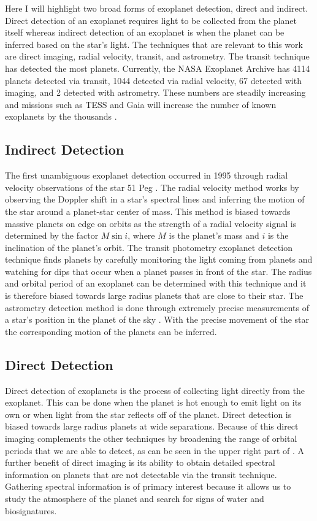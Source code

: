 Here I will highlight two broad forms of exoplanet detection, direct and
indirect. Direct detection of an exoplanet requires light to be collected from
the planet itself whereas indirect detection of an exoplanet is when the planet
can be inferred based on the star's light. The techniques that are relevant to
this work are direct imaging, radial velocity, transit, and astrometry. The
transit technique has detected the most planets. Currently, the NASA Exoplanet
Archive has 4114 planets detected via transit, 1044 detected via radial
velocity, 67 detected with imaging, and 2 detected with astrometry. These
numbers are steadily increasing and missions such as TESS and Gaia will
increase the number of known exoplanets by the thousands \citep{Perryman2018a}
\citep{Huang2018}.

\subsection{Indirect Detection} 

The first unambiguous exoplanet detection occurred in 1995 through radial
velocity observations of the star 51 Peg \citep{mayorJupitermassCompanion1995}.
The radial velocity method works by observing the Doppler shift in a star's
spectral lines and inferring the motion of the star around a planet-star center
of mass. This method is biased towards massive planets on edge on orbits as the
strength of a radial velocity signal is determined by the factor $M\sin{i}$,
where $M$ is the planet's mass and $i$ is the inclination of the planet's
orbit. The transit photometry exoplanet detection technique finds planets by
carefully monitoring the light coming from planets and watching for dips that
occur when a planet passes in front of the star. The radius and orbital period
of an exoplanet can be determined with this technique and it is therefore
biased towards large radius planets that are close to their star. The
astrometry detection method is done through extremely precise measurements of a
star's position in the planet of the sky \citep{Perryman2018a}. With the
precise movement of the star the corresponding motion of the planets can be
inferred.


\subsection{Direct Detection}

Direct detection of exoplanets is the process of collecting light directly from
the exoplanet. This can be done when the planet is hot enough to emit light on
its own or when light from the star reflects off of the planet. Direct
detection is biased towards large radius planets at wide separations. Because
of this direct imaging complements the other techniques by broadening the range
of orbital periods that we are able to detect, as can be seen in the upper
right part of . A further benefit of
direct imaging is its ability to obtain detailed spectral information on
planets that are not detectable via the transit technique. Gathering spectral
information is of primary interest because it allows us to study the atmosphere
of the planet and search for signs of water and biosignatures.

